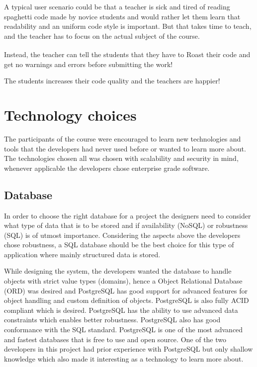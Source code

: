 \documentclass[12pt,a4paper]{report}
\begin{document}
A typical user scenario could be that a teacher is sick and tired of reading spaghetti code made by novice students and would rather let them learn that readability and an uniform code style is important. But that takes time to teach, and the teacher has to focus on the actual subject of the course.

Instead, the teacher can tell the students that they have to Roast\textsuperscript{\textregistered} their code and get no warnings and errors before submitting the work!

The students increases their code quality and the teachers are happier!

\chapter{Technology choices}
The participants of the course were encouraged to learn new technologies and tools that the developers had never used before or wanted to learn more about. The technologies chosen all was chosen with scalability and security in mind, whenever applicable the developers chose enterprise grade software.

\section{Database}
In order to choose the right database for a project the designers need to consider what type of data that is to be stored and if availability (NoSQL) or robustness (SQL) is of utmost importance.
Considering the aspects above the developers chose robustness, a SQL database should be the best choice for this type of application where mainly structured data is stored.

While designing the system, the developers wanted the database to handle objects with strict value types (domains), hence a Object Relational Database (ORD) was desired and PostgreSQL has good support for advanced features for object handling and custom definition of objects. PostgreSQL is also fully ACID compliant\cite{pg-acid} which is desired. PostgreSQL has the ability to use advanced data constraints which enables better robustness. PostgreSQL also has good conformance with the SQL standard\cite{pg-sql-conformance}. PostgreSQL is one of the most advanced and fastest databases\cite{db-benchmark} that is free to use and open source.
One of the two developers in this project had prior experience with PostgreSQL but only shallow knowledge which also made it interesting as a technology to learn more about.
\end{document}
